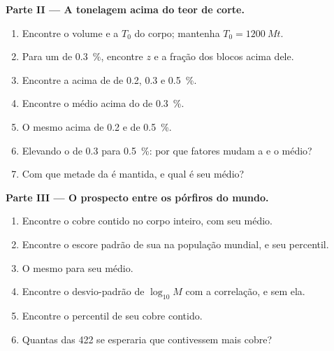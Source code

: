 \begin{problem}
\noindent\textbf{Parte II --- A tonelagem acima do teor de corte.}
\begin{enumerate}[resume]
  \item Encontre o volume e a  $T_0$ do corpo; mantenha $T_0 = \qty{1200}{Mt}$.
  \item Para um  de \qty{0.3}{\percent}, encontre $z$ e a fração dos blocos acima dele.
  \item Encontre a  acima de  de 0.2, 0.3 e \qty{0.5}{\percent}.
  \item Encontre o  médio acima do  de \qty{0.3}{\percent}.
  \item O mesmo acima de 0.2 e de \qty{0.5}{\percent}.
  \item Elevando o  de 0.3 para \qty{0.5}{\percent}: por que fatores mudam a  e o
         médio?
  \item Com que  metade da  é mantida, e qual é seu  médio?
\end{enumerate}

\noindent\textbf{Parte III --- O prospecto entre os pórfiros do mundo.}
\begin{enumerate}[resume]
  \item Encontre o cobre contido no corpo inteiro, com seu  médio.
  \item Encontre o escore padrão de sua  na população mundial, e seu percentil.
  \item O mesmo para seu  médio.
  \item Encontre o desvio-padrão de $\log_{10} M$ com a correlação, e sem ela.
  \item Encontre o percentil de seu cobre contido.
  \item Quantas das 422  se esperaria que contivessem mais cobre?
\end{enumerate}


\end{problem}
